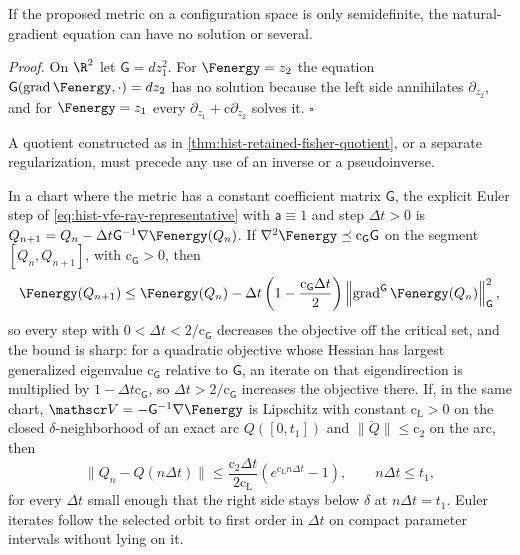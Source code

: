 If the proposed metric on a configuration space is only semidefinite, the
natural-gradient equation can have no solution or several.  

\noindent\emph{Proof.}
On $\R^2$ let $\mathsf G=dz_1^2$.  For $\Fenergy=z_2$ the equation
$\mathsf G(\operatorname{grad}\Fenergy,\cdot)=dz_2$ has no solution because the left side
annihilates $\partial_{z_2}$, and for $\Fenergy=z_1$ every
$\partial_{z_1}+\mathrm c\partial_{z_2}$ solves it.  $\square$

A quotient constructed as in \cref{thm:hist-retained-fisher-quotient}, or a separate
regularization, must precede any use of an inverse or a pseudoinverse.

In a chart where the metric has a constant coefficient matrix $\mathsf G$, the explicit
Euler step of \eqref{eq:hist-vfe-ray-representative} with $\mathsf a\equiv1$ and step
$\Delta t>0$ is $Q_{n+1}=Q_n-\Delta t\mathsf G^{-1}\nabla\Fenergy(Q_n)$.  If
$\nabla^2\Fenergy\preceq\mathrm c_{\mathsf G}\mathsf G$ on the segment $[Q_n,Q_{n+1}]$,
with $\mathrm c_{\mathsf G}>0$, then
\begin{equation}
\Fenergy(Q_{n+1})
\leq\Fenergy(Q_n)
-\Delta t\left(1-\frac{\mathrm c_{\mathsf G}\Delta t}{2}\right)
\left\|\operatorname{grad}^{\mathsf G}\Fenergy(Q_n)\right\|^2_{\mathsf G},
\label{eq:hist-discrete-descent-bound}
\end{equation}
so every step with $0<\Delta t<2/\mathrm c_{\mathsf G}$ decreases the objective off the
critical set, and the bound is sharp: for a quadratic objective whose Hessian has largest
generalized eigenvalue $\mathrm c_{\mathsf G}$ relative to $\mathsf G$, an iterate on that
eigendirection is multiplied by $1-\Delta t\mathrm c_{\mathsf G}$, so
$\Delta t>2/\mathrm c_{\mathsf G}$ increases the objective there.  If, in the same chart,
$\mathscr V=-\mathsf G^{-1}\nabla\Fenergy$ is Lipschitz with constant
$\mathrm c_{\mathrm L}>0$ on the closed $\delta$-neighborhood of an exact arc $Q([0,t_1])$
and $\lVert\ddot Q\rVert\leq\mathrm c_2$ on the arc, then
\begin{equation}
\lVert Q_n-Q(n\Delta t)\rVert
\leq\frac{\mathrm c_2\Delta t}{2\mathrm c_{\mathrm L}}\left(e^{\mathrm c_{\mathrm L}n\Delta t}-1\right),
\qquad n\Delta t\leq t_1,
\label{eq:hist-euler-global-error}
\end{equation}
for every $\Delta t$ small enough that the right side stays below $\delta$ at
$n\Delta t=t_1$.  Euler iterates follow the selected orbit to first order in $\Delta t$
on compact parameter intervals without lying on it.  

